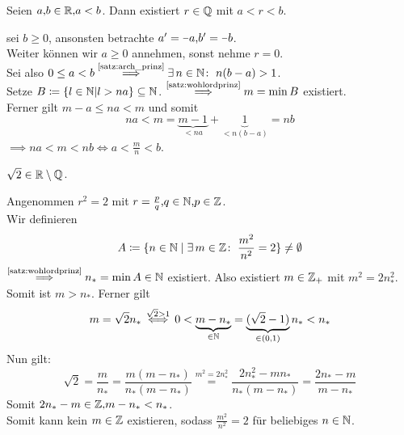 \documentclass[../ana1.tex]{subfiles}
\begin{document}
\begin{satz}
	Seien \(a \text{,} b \in \mathbb{R} \text{,} a < b \). Dann existiert \( r \in \mathbb{Q} \) mit \(a < r < b \).
\end{satz}
\begin{bew}
	\obda  sei \(b \geq 0 \), ansonsten betrachte \( a^\prime = \minus{a} \ko b^\prime = \minus{b} \). \\
	Weiter können wir \(a \geq 0 \) annehmen, sonst nehme \(r = 0 \). \\
	Sei also \(0 \leq a < b \overset{\text{\autoref{satz:arch_prinz}}}{\implies} \exists \, n \in \N \colon \; n(b-a) > 1 \). \\
	Setze \( B \coloneqq \{ l \in \mathbb{N} \vert l > na \} \subseteq \mathbb{N} \).
	\( \overset{\text{\autoref{satz:wohlordprinz}}}{\implies} m = \min B \) existiert.\\
	Ferner gilt \(m-a \leq na < m \) und somit
	\[ na < m = \underbrace{m-1}_{< na} + \underbrace{1}_{< n(b-a)} = nb \]
	\(\implies na < m  < nb \iff a < \frac{m}{n} < b\).
\end{bew}

\iftoggle{short}{}{\newpage}%

\begin{bem}
	\(\sqrt{2} \in \mathbb{R} \setminus \mathbb{Q} \).
\end{bem}
\begin{bew}
	Angenommen \( r^2 = 2 \) mit \( r = \frac{p}{q} \text{,} q \in \mathbb{N} \text{,} p \in \mathbb{Z} \). \\
	Wir definieren 
	\[A \coloneqq \{n \in \mathbb{N} \; \vert \; \exists \, m \in \mathbb{Z} \colon \; \frac{m^2}{n^2} = 2\} \neq \emptyset \]
	\(\overset{\text{\autoref{satz:wohlordprinz}}}{\implies} n_* = \min A \in \N \) existiert. Also existiert \( m \in \mathbb{Z}_+ \) mit
	\(m^2 = 2n_*^2\). Somit ist \(m > n_* \).
	Ferner gilt
	\[ m= \sqrt{2}n_* \overset{\sqrt{2} > 1}{\iff} 0 < \underbrace{m - n_*}_{\in \mathbb{N}} = \underbrace{(\sqrt{2} - 1)}_{\in (0 \text{,} 1)} n_* < n_* \]
	Nun gilt: 
	\[ \sqrt{2} = \frac{m}{n_*} = \frac{m(m - n_*)}{n_*(m-n_*)} \overset{m^2 = 2n_*^2}{=} \frac{2n_*^2 - mn_*}{n_*(m - n_*)} = \frac{2n_* - m}{m - n_*} \]
	Somit \(2n_* - m \in \mathbb{Z} \text{,} m - n_* < n_* \).  \\
	Somit kann kein \(m \in \mathbb{Z} \) existieren, sodass \(\frac{m^2}{n^2} = 2 \) für beliebiges \(n \in \mathbb{N} \).
\end{bew}
\end{document}
